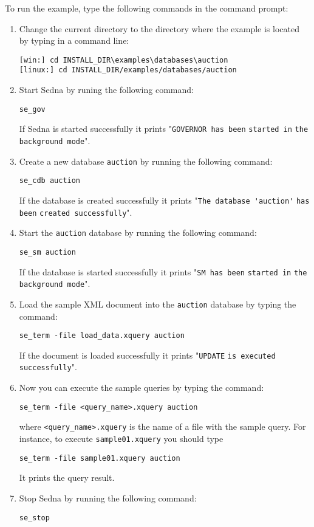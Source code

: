 \documentclass[a4paper,12pt]{article}
\begin{document}
To run the example, type the following commands in the command prompt:
\begin{enumerate}
\item Change the current directory to the directory where the example is located by typing in a command line:
\begin{verbatim}
[win:] cd INSTALL_DIR\examples\databases\auction
[linux:] cd INSTALL_DIR/examples/databases/auction
\end{verbatim}
\item Start Sedna by runing the following command: 
\begin{verbatim}
se_gov 
\end{verbatim}
If Sedna is started successfully it prints "\verb!GOVERNOR has been! \verb!started in! \verb!the background mode!".
\item Create a new database \verb!auction! by running the following command: 
\begin{verbatim}
se_cdb auction
\end{verbatim}
If the database is created successfully it prints "\verb!The database 'auction'! \verb!has been! \verb!created successfully!". 
\item Start the \verb!auction! database by running the following command:
\begin{verbatim}
se_sm auction
\end{verbatim}
If the database is started successfully it prints "\verb!SM has been! \verb!started in! \verb!the background mode!".
\item Load the sample XML document into the \verb!auction! database by typing the command:
\begin{verbatim}
se_term -file load_data.xquery auction
\end{verbatim}
If the document is loaded successfully it prints "\verb!UPDATE! \verb!is executed! \verb!successfully!".
\item Now you can execute the sample queries by typing the command:
\begin{verbatim}
se_term -file <query_name>.xquery auction
\end{verbatim}
where \verb!<query_name>.xquery! is the name of a file with the sample query.
For instance, to execute \verb!sample01.xquery! you should type 
\begin{verbatim}
se_term -file sample01.xquery auction
\end{verbatim}
It prints the query result.
\item Stop Sedna by running the following command:
\begin{verbatim}
se_stop
\end{verbatim}
\end{enumerate}
\end{document}

